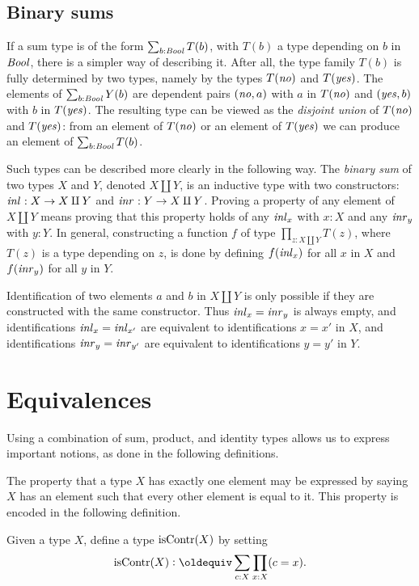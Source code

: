\subsection{Binary sums}
\label{sec:binsum-types}
If a sum type is of the form $\sum_{b:\mathop{\mathit{Bool}}} T(b)$, with $T(b)$
a type depending on $b$ in $\mathop{\mathit{Bool}}$, there is a simpler way of
describing it. After all, the type family $T(b)$ is fully determined
by two types, namely by the types $T(\mathop{\mathit{no}})$ and $T(\mathop{\mathit{yes}})$.
The elements of $\sum_{b:\mathop{\mathit{Bool}}} Y(b)$ are dependent pairs $(\mathop{\mathit{no}},a)$ with
$a$ in $T(\mathop{\mathit{no}})$ and $(\mathop{\mathit{yes}},b)$ with $b$ in $T(\mathop{\mathit{yes}})$. The resulting
type can be viewed as the \emph{disjoint union} of $T(\mathop{\mathit{no}})$ and $T(\mathop{\mathit{yes}})$:
from an element of $T(\mathop{\mathit{no}})$ or an element of $T(\mathop{\mathit{yes}})$ 
we can produce an element of $\sum_{b:\mathop{\mathit{Bool}}} T(b)$.  

Such types can be described more clearly in the following way.
The \emph{binary sum} of two types $X$ and $Y$, denoted $X \amalg Y$,
is an inductive type with two constructors: $\mathop{{\it inl}_{}} : X \to X \amalg Y$ and
$\mathop{{\it inr}_{}} : Y \to X \amalg Y$. Proving a property of any element of $X \amalg Y$
means proving that this property holds of any $\mathop{{\it inl}_{x}}$ with $x:X$ and any
$\mathop{{\it inr}_{y}}$ with $y:Y$. In general, constructing a function $f$ of type
$\prod_{z: X \amalg Y} T(z)$, where $T(z)$ is a type depending on 
$z$, is done by defining $f(\mathop{{\it inl}_{x}})$ for all $x$ in $X$
and $f(\mathop{{\it inr}_{y}})$ for all $y$ in $Y$.

Identification of two elements $a$ and $b$ in $X \amalg Y$ is 
only possible if they are constructed with the same constructor.
Thus $\mathop{{\it inl}_{x}} = \mathop{{\it inr}_{y}}$ is always empty, and identifications
$\mathop{{\it inl}_{x}} = \mathop{{\it inl}_{x'}}$ are equivalent to identifications $x=x'$ in $X$,
and identifications
$\mathop{{\it inr}_{y}} = \mathop{{\it inr}_{y'}}$ are equivalent to identifications $y=y'$ in $Y$.

\section{Equivalences}\label{sec:equivalence}

Using a combination of sum, product, and identity types allows
us to express important notions, as done in the following
definitions.

The property that a type $X$ has exactly one element may be expressed by saying $X$ has an element such that every other element is equal to it.
This property is encoded in the following definition.

\begin{definition}
  \label{def:contractible}
  Given a type $X$, define a type $\mathrm{isContr}(X)$ by setting
  $$\iscontr(X) \defeq \sum_{c:X} \prod_{x:X} (c=x).$$
\end{definition}

